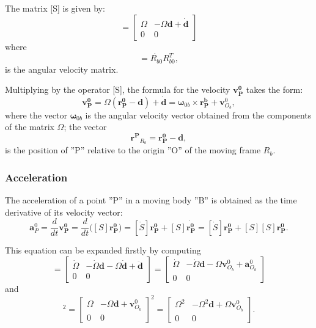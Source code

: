 \documentclass{article}
\begin{document}
The matrix [S] is given by:
\begin{equation} [S] =  \begin{bmatrix} \Omega & -\Omega\textbf{d} + \dot{\textbf{d}} \\ 0 & 0 \end{bmatrix}\end{equation}
where
\begin{equation} [\Omega] = \dot{R_{b0}}R_{b0}^T,\end{equation}
is the angular velocity matrix.

Multiplying by the operator [S], the formula for the velocity $\mathbf{v^0_P}$ takes the form:
\begin{equation}\mathbf{v^0_P} = \Omega (\mathbf{r^0_P}-\textbf{d}) + \dot{\textbf{d}} =  \mathbf{\omega}_{0b} \times  \mathbf{r^b_P} + \mathbf{v}^0_{O_b},\end{equation}
where the vector $ \mathbf{\omega}_{0b}$ is the angular velocity vector obtained from the components of the matrix  $\Omega$; the vector
\begin{equation}  \mathbf{r^P}_{R_b} =\mathbf{r^0_P}-\textbf{d},\end{equation}
is the position of ''P'' relative to the origin ''O'' of the moving frame $R_b$.


\subsubsection{Acceleration}
The acceleration of a point ''P'' in a moving body ''B'' is obtained as the time derivative of its velocity vector:
\begin{equation}\mathbf{a}^0_P = \frac{d}{dt}\mathbf{v^0_P} = \frac{d}{dt}\big([S]\mathbf{r^0_P}\big)=[\dot{S}]\mathbf{r^0_P} + [S]\dot{\mathbf{r^0_P}} = [\dot{S}]\mathbf{r^0_P} + [S][S]\mathbf{r^0_P} .\end{equation}

This equation can be expanded firstly by computing
\begin{equation} [\dot{S}] =  \begin{bmatrix} \dot{\Omega} & -\dot{\Omega}\textbf{d}  -\Omega\dot{\textbf{d}}  + \ddot{\textbf{d}} \\ 0 & 0 \end{bmatrix} = \begin{bmatrix} \dot{\Omega} & -\dot{\Omega}\textbf{d}  -\Omega \mathbf{v}^0_{O_b}  + \mathbf{a}^0_{O_b} \\ 0 & 0 \end{bmatrix}\end{equation}
and
\begin{equation} [S]^2 =  \begin{bmatrix} \Omega & -\Omega\textbf{d} + \mathbf{v}^0_{O_b}  \\ 0 & 0 \end{bmatrix}^2 = \begin{bmatrix} \Omega^2 & -\Omega^2\textbf{d} + \Omega \mathbf{v}^0_{O_b}  \\ 0 & 0 \end{bmatrix}.\end{equation}
\end{document}
